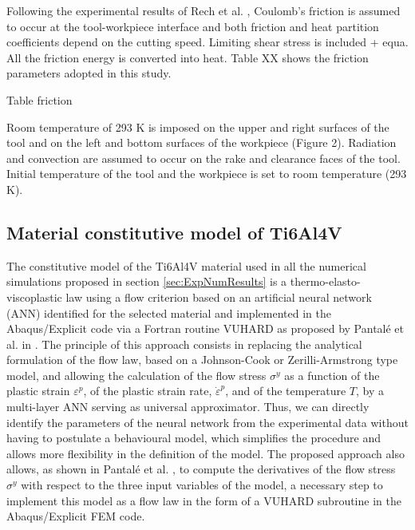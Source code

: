 \documentclass[final,5p,times,twocolumn]{elsarticle}
\begin{document}
Following the experimental results of Rech et al. \cite{rech_characterisation_2013}, Coulomb's friction is assumed to occur at the tool-workpiece interface and both friction and heat partition coefficients depend on the cutting speed. Limiting shear stress is included + equa. All the friction energy is converted into heat. Table XX shows the friction parameters adopted in this study.

%
Table friction
%

Room temperature of 293 K is imposed on the upper and right surfaces of the tool and on the left and bottom surfaces of the workpiece (Figure 2). Radiation and convection are assumed to occur on the rake and clearance faces of the tool. Initial temperature of the tool and the workpiece is set to room temperature (293 K).

\subsection{Material constitutive model of Ti6Al4V}

The constitutive model of the Ti6Al4V material used in all the numerical simulations proposed in section \ref{sec:ExpNumResults} is a thermo-elasto-viscoplastic law using a flow criterion based on an artificial neural network (ANN) identified for the selected material and implemented in the Abaqus/Explicit code via a Fortran routine VUHARD as proposed by Pantalé et al. in \cite{pantale_efficient_2022}.
The principle of this approach consists in replacing the analytical formulation of the flow law, based on a Johnson-Cook or Zerilli-Armstrong type model, and allowing the calculation of the flow stress $\sigma^y$ as a function of the plastic strain $\varepsilon^p$, of the plastic strain rate, ${\dot{\varepsilon}}^p$, and of the temperature $T$, by a multi-layer ANN serving as universal approximator. Thus, we can directly identify the parameters of the neural network from the experimental data without having to postulate a behavioural model, which simplifies the procedure and allows more flexibility in the definition of the model.
The proposed approach also allows, as shown in Pantalé et al. \cite{pantale_efficient_2022}, to compute the derivatives of the flow stress $\sigma^y$ with respect to the three input variables of the model, a necessary step to implement this model as a flow law in the form of a VUHARD subroutine in the Abaqus/Explicit FEM code.
\end{document}
